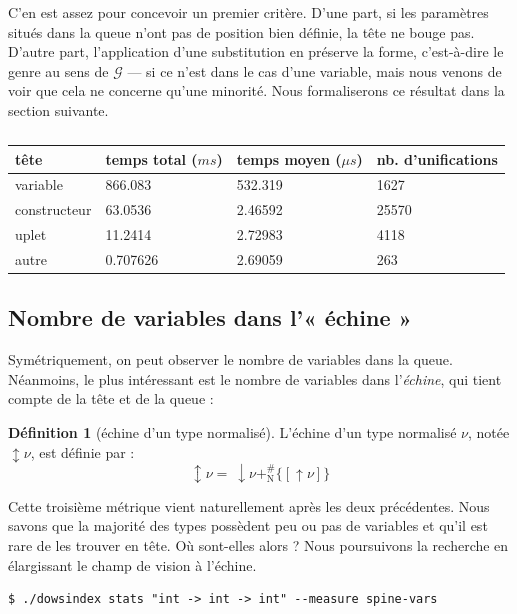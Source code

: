 \documentclass[a4paper]{report}
\theoremstyle{definition}
\newtheorem{definition}[theoreme]{Définition}
\newcommand{\mset}[1]{\{\![#1]\!\}}
\newcommand{\G}{\mathscr{G}}
\newcommand{\N}{\mathrm{N}}
\begin{document}
C'en est assez pour concevoir un premier critère. D'une part, si les paramètres situés dans la queue n'ont pas de position bien définie, la tête ne bouge pas. D'autre part, l'application d'une substitution en préserve la forme, c'est-à-dire le genre au sens de $\G$ — si ce n'est dans le cas d'une variable, mais nous venons de voir que cela ne concerne qu'une minorité. Nous formaliserons ce résultat dans la section suivante.

\begin{table}[h]
	\centering
	\begin{tabular}{|l|l|l|l|}
		\hline
			tête &
			temps total ($ms$) &
			temps moyen ($\mu s$) &
			nb. d'unifications
		\\
		\hline
			variable & 866.083 & 532.319 & 1627
		\\
			constructeur & 63.0536 & 2.46592 & 25570
		\\
			uplet & 11.2414 & 2.72983 & 4118
		\\
			autre & 0.707626 & 2.69059 & 263
		\\
		\hline
	\end{tabular}
	\caption{\label{tab_meas2}}
\end{table}


\subsection{Nombre de variables dans l'« échine »}

Symétriquement, on peut observer le nombre de variables dans la queue. Néanmoins, le plus intéressant est le nombre de variables dans l'\emph{échine}, qui tient compte de la tête et de la queue :

\begin{definition}[échine d'un type normalisé]
	L'échine d'un type normalisé $\nu$, notée $\updownarrow \nu$, est définie par :
	\[ \updownarrow \nu =\ \downarrow \nu +^\#_\N \mset{\uparrow \nu} \]
\end{definition}

Cette troisième métrique vient naturellement après les deux précédentes. Nous savons que la majorité des types possèdent peu ou pas de variables et qu'il est rare de les trouver en tête. Où sont-elles alors ? Nous poursuivons la recherche en élargissant le champ de vision à l'échine.

\begin{verbatim}
$ ./dowsindex stats "int -> int -> int" --measure spine-vars
\end{verbatim}
\end{document}
